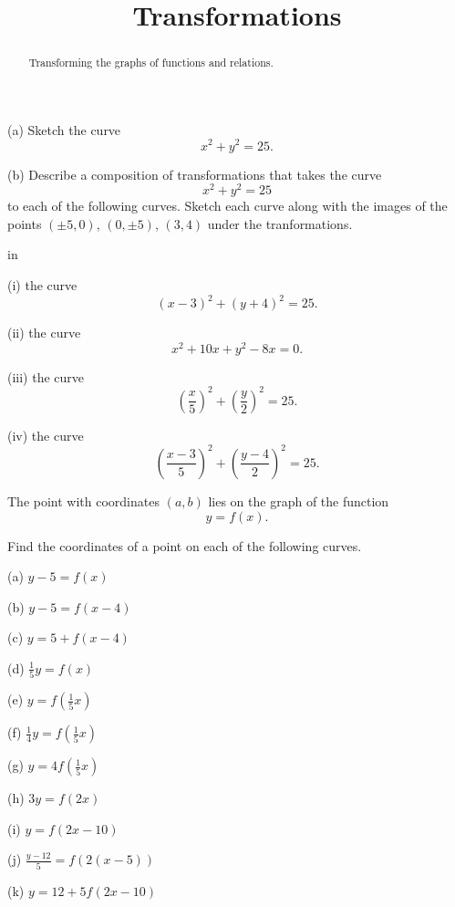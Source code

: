 \documentclass{ximera}
\title{Transformations}
\newcommand{\pskip}{\vskip 0.1 in}
\begin{document}
\begin{abstract}
Transforming the graphs of functions and relations.
\end{abstract}
\maketitle



\begin{question}  \label{Q:324bt44t}
(a) Sketch the curve
\[
    x^2 + y^2 = 25 .
\]

(b) Describe a composition of transformations that takes the curve
\[
        x^2 + y^2 = 25
\]
to each of the following curves. Sketch each curve along with the images of the points $(\pm 5,0)$, $(0,\pm 5)$, $(3,4)$ under the tranformations.

\pskip

(i) the curve
\[
          (x-3)^2 + (y+4)^2 = 25 .
\]

(ii)  the curve
\[
          x^2 +10x +y^2 - 8x = 0 .
\]

(iii) the curve
\[
       \left( \frac{x}{5} \right)^2 + \left( \frac{y}{2} \right)^2 = 25 .
\]

(iv) the curve
\[
       \left( \frac{x-3}{5} \right)^2 + \left( \frac{y-4}{2} \right)^2 = 25 .
\]

\end{question}


\begin{question}  \label{Q:3dd5r555234}
The point with coordinates $(a,b)$ lies on the graph of the function
\[
  y = f(x).
\]

Find the coordinates of a point on each of the following curves.

(a) $y - 5 = f(x)$

(b) $y - 5 = f(x-4)$

(c) $y= 5 + f(x-4)$

(d) $\frac{1}{5}y = f(x)$

(e) $y = f\left( \frac{1}{5} x \right)$

(f) $\frac{1}{4}y =  f\left( \frac{1}{5} x \right)$

(g) $y =  4  f\left( \frac{1}{5} x \right)$

(h) $3y = f(2x)$

(i) $y = f(2x-10)$

(j)  $\frac{y-12}{5} = f(2(x-5))$

(k) $y = 12 + 5 f(2x-10)$

\end{question}
\end{document}
